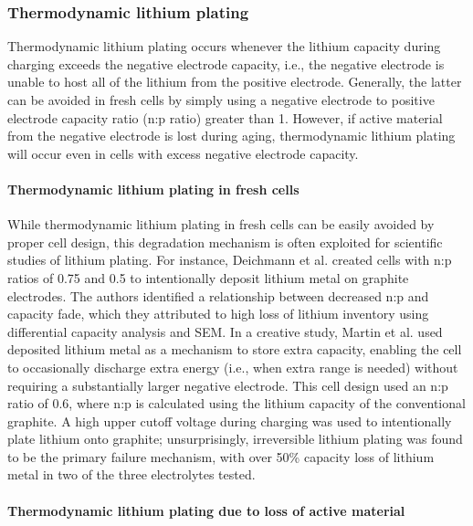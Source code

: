 \documentclass[journal=jpcl, manuscript=article, layout=onecolumn]{achemso}
\begin{document}
\subsubsection{Thermodynamic lithium plating}


Thermodynamic lithium plating occurs whenever the lithium capacity during charging exceeds the negative electrode capacity, i.e., the negative electrode is unable to host all of the lithium from the positive electrode. Generally, the latter can be avoided in fresh cells by simply using a negative electrode to positive electrode capacity ratio (n:p ratio) greater than 1. However, if active material from the negative electrode is lost during aging, thermodynamic lithium plating will occur even in cells with excess negative electrode capacity.

\paragraph{Thermodynamic lithium plating in fresh cells}

While thermodynamic lithium plating in fresh cells can be easily avoided by proper cell design, this degradation mechanism is often exploited for scientific studies of lithium plating.
For instance, Deichmann et al.\cite{deichmann_investigating_2020} created cells with n:p ratios of 0.75 and 0.5 to intentionally deposit lithium metal on graphite electrodes. The authors identified a relationship between decreased n:p and capacity fade, which they attributed to high loss of lithium inventory using differential capacity analysis and SEM. In a creative study, Martin et al.\cite{martin_cycling_2020} used deposited lithium metal as a mechanism to store extra capacity, enabling the cell to occasionally discharge extra energy (i.e., when extra range is needed) without requiring a substantially larger negative electrode. This cell design used an n:p ratio of 0.6, where n:p is calculated using the lithium capacity of the conventional graphite. A high upper cutoff voltage during charging was used to intentionally plate lithium onto graphite; unsurprisingly, irreversible lithium plating was found to be the primary failure mechanism, with over 50\% capacity loss of lithium metal in two of the three electrolytes tested.

\paragraph{Thermodynamic lithium plating due to loss of active material}
\end{document}
